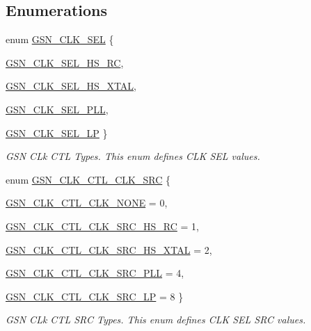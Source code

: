 \subsection*{Enumerations}
\begin{DoxyCompactItemize}
\item 
enum \hyperlink{a00644_ga1b0f0bc3777cd50abe5f39797df023b5}{GSN\_\-CLK\_\-SEL} \{ \par
\hyperlink{a00644_gga1b0f0bc3777cd50abe5f39797df023b5a6d77f67c5fe2d58a1800d47a3405bdbb}{GSN\_\-CLK\_\-SEL\_\-HS\_\-RC}, 
\par
\hyperlink{a00644_gga1b0f0bc3777cd50abe5f39797df023b5a84a3dddc792558a0c75441bf1d6cb991}{GSN\_\-CLK\_\-SEL\_\-HS\_\-XTAL}, 
\par
\hyperlink{a00644_gga1b0f0bc3777cd50abe5f39797df023b5a67004660ec5d9c601cb897e7feb94047}{GSN\_\-CLK\_\-SEL\_\-PLL}, 
\par
\hyperlink{a00644_gga1b0f0bc3777cd50abe5f39797df023b5acdcf68cddce2291868ff3ad7223e7b05}{GSN\_\-CLK\_\-SEL\_\-LP}
 \}
\begin{DoxyCompactList}\small\item\em GSN CLk CTL Types. This enum defines CLK SEL values. \end{DoxyCompactList}\item 
enum \hyperlink{a00644_ga53f0e57a2fa30eef772141f9ac772202}{GSN\_\-CLK\_\-CTL\_\-CLK\_\-SRC} \{ \par
\hyperlink{a00644_gga53f0e57a2fa30eef772141f9ac772202a778d05cc32c381d03f443ac3a8cfe4c9}{GSN\_\-CLK\_\-CTL\_\-CLK\_\-NONE} =  0, 
\par
\hyperlink{a00644_gga53f0e57a2fa30eef772141f9ac772202a02bb61fbda65f8b12d2a10e7cea70246}{GSN\_\-CLK\_\-CTL\_\-CLK\_\-SRC\_\-HS\_\-RC} =  1, 
\par
\hyperlink{a00644_gga53f0e57a2fa30eef772141f9ac772202abad63f96e1fa920dacacee0a840414fc}{GSN\_\-CLK\_\-CTL\_\-CLK\_\-SRC\_\-HS\_\-XTAL} =  2, 
\par
\hyperlink{a00644_gga53f0e57a2fa30eef772141f9ac772202ae43332cf79f679999752978cc45713f3}{GSN\_\-CLK\_\-CTL\_\-CLK\_\-SRC\_\-PLL} =  4, 
\par
\hyperlink{a00644_gga53f0e57a2fa30eef772141f9ac772202ae05644f7e6452d1a1d374c212763ec06}{GSN\_\-CLK\_\-CTL\_\-CLK\_\-SRC\_\-LP} =  8
 \}
\begin{DoxyCompactList}\small\item\em GSN CLk CTL SRC Types. This enum defines CLK SEL SRC values. \end{DoxyCompactList}\end{DoxyCompactItemize}
